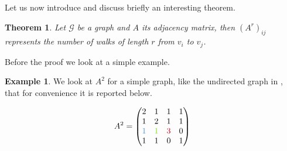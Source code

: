 \documentclass[12pt,a4paper]{report}
\newtheorem{theorem}{Theorem}[chapter] %
\theoremstyle{definition}
\newtheorem{example}{Example}[chapter]
\begin{document}
Let us now introduce and discuss briefly an interesting theorem.
\begin{theorem}
\label{the:walks}
Let $\mathcal{G}$ be a graph and $A$ its adjacency matrix, then $\left( A^r \right)_{ij}$ represents the number of walks of length $r$ from $v_i$ to $v_j$.
\end{theorem}
Before the proof we look at a simple example.
\begin{example}
We look at $A^2$ for a simple graph, like the undirected graph in , that for convenience it is reported below.
\begin{figure}[h]
\centering
    \begin{minipage}[]{0.3\linewidth}
    \centering
        \begin{equation*}
        A^2 =
        \begin{pmatrix}
        2 & 1 & 1 & 1 \\
        1 & 2 & 1 & 1 \\
        \textcolor{tikz_blue}{1} & \textcolor{tikz_green}{1} & \textcolor{tikz_red}{3} & 0 \\
        1 & 1 & 0 & 1
        \end{pmatrix}
        \end{equation*}
    \label{fig:A^2}
    \end{minipage}
\hspace{1cm}
    \begin{minipage}[]{0.3\linewidth}
    \centering
        \begin{tikzpicture}[x=0.75pt,y=0.75pt,yscale=-1,xscale=1]
        

\end{tikzpicture}
\end{minipage}
\end{figure}
\end{example}
\end{document}
